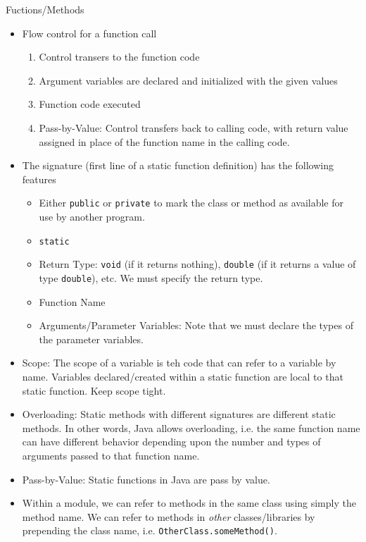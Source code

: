 \documentclass[12pt]{article}
\theoremstyle{plain}
\theoremstyle{definition}
\theoremstyle{remark}
\begin{document}
\clearpage
Fuctions/Methods
\begin{itemize}
  \item Flow control for a function call
    \begin{enumerate}
      \item Control transers to the function code
      \item Argument variables are declared and initialized with the
        given values
      \item Function code executed
      \item
        Pass-by-Value:
        Control transfers back to calling code, with return value
        assigned in place of the function name in the calling code.
    \end{enumerate}
  \item The signature (first line of a static function definition)
    has the following features
    \begin{itemize}
      \item Either \texttt{public} or \texttt{private} to mark the
        class or method as available for use by another program.
      \item \texttt{static}
      \item Return Type:
        \texttt{void} (if it returns nothing),
        \texttt{double} (if it returns a value of type
        \texttt{double}),
        etc.
        We must specify the return type.
      \item Function Name
      \item Arguments/Parameter Variables:
        Note that we must declare the types of the parameter
        variables.
    \end{itemize}

  \item
    Scope:
    The scope of a variable is teh code that can refer to a variable by
    name.
    Variables declared/created within a static function are local to
    that static function.
    Keep scope tight.

  \item Overloading:
    Static methods with different signatures are different static
    methods. In other words, Java allows overloading, i.e. the
    same function name can have different behavior depending upon
    the number and types of arguments passed to that function name.

  \item Pass-by-Value:
    Static functions in Java are pass by value.

  \item
    Within a module, we can refer to methods in the same class using
    simply the method name.  We can refer to methods in \emph{other}
    classes/libraries by prepending the class name, i.e.
    \texttt{OtherClass.someMethod()}.
\end{itemize}
\end{document}
